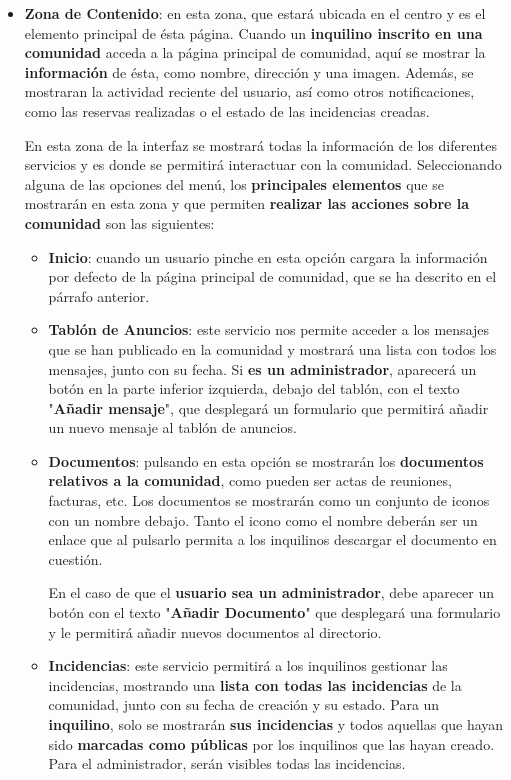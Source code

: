 \begin{appendices}
\begin{itemize}
\begin{itemize}
		\item \textbf{Zona de Contenido}: en esta zona, que estará ubicada en el centro y es el elemento principal de ésta página. Cuando un \textbf{inquilino inscrito en una comunidad} acceda a la página principal de comunidad, aquí se mostrar la \textbf{información} de ésta, como nombre, dirección y una imagen. Además, se mostraran la actividad reciente del usuario, así como otros notificaciones, como las reservas realizadas o el estado de las incidencias creadas.
		
		En esta zona de la interfaz se mostrará todas la información de los diferentes servicios y es donde se permitirá interactuar con la comunidad. Seleccionando alguna de las opciones del menú, los \textbf{principales elementos} que se mostrarán en esta zona y que permiten \textbf{realizar las acciones sobre la comunidad} son las siguientes: 
		
		\begin{itemize}
			\item \textbf{Inicio}: cuando un usuario pinche en esta opción cargara la información por defecto de la página principal de comunidad, que se ha descrito en el párrafo anterior.
			
			\item \textbf{Tablón de Anuncios}: este servicio nos permite acceder a los mensajes que se han publicado en la comunidad y mostrará una lista con todos los mensajes, junto con su fecha. Si \textbf{es un administrador}, aparecerá un botón en la parte inferior izquierda, debajo del tablón, con el texto "\textbf{Añadir mensaje}", que desplegará un formulario que permitirá añadir un nuevo mensaje al tablón de anuncios.	
			
			\item \textbf{Documentos}: pulsando en esta opción se mostrarán los \textbf{documentos relativos a la comunidad}, como pueden ser actas de reuniones, facturas, etc. Los documentos se mostrarán como un conjunto de iconos con un nombre debajo. Tanto el icono como el nombre deberán ser un enlace que al pulsarlo permita a los inquilinos descargar el documento en cuestión. 
			
			En el caso de que el \textbf{usuario sea un administrador}, debe aparecer un botón con el texto "\textbf{Añadir Documento}" que desplegará una formulario y le permitirá añadir nuevos documentos al directorio. 
			
			\item \textbf{Incidencias}: este servicio permitirá a los inquilinos gestionar las incidencias, mostrando una \textbf{lista con todas las incidencias} de la comunidad, junto con su fecha de creación y su estado. Para un \textbf{inquilino}, solo se mostrarán \textbf{sus incidencias} y todos aquellas que hayan sido \textbf{marcadas como públicas} por los inquilinos que las hayan creado. Para el administrador, serán visibles todas las incidencias.
			

\end{itemize}
\end{itemize}
\end{itemize}
\end{appendices}
